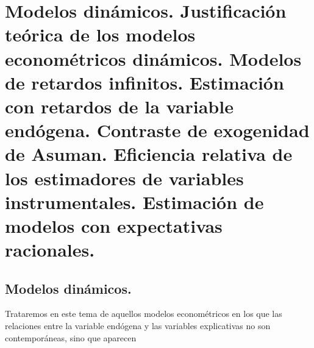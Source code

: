 
\chapter{Modelos din\'amicos. Justificaci\'on te\'orica de los modelos econom\'etricos
din\'amicos. Modelos de retardos infinitos. Estimaci\'on con retardos
de la variable end\'ogena. Contraste de exogenidad de Asuman. Eficiencia
relativa de los estimadores de variables instrumentales. Estimaci\'on
de modelos con expectativas racionales.}


\section{Modelos din\'amicos.}

Trataremos en este tema de aquellos modelos econom\'etricos en los que
las relaciones entre la variable end\'ogena y las variables explicativas
no son contempor\'aneas, sino que aparecen
